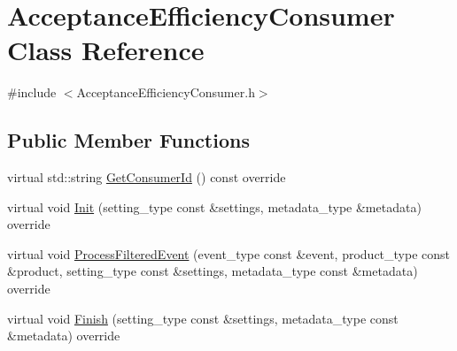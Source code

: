 \hypertarget{classAcceptanceEfficiencyConsumer}{
\section{AcceptanceEfficiencyConsumer Class Reference}
\label{classAcceptanceEfficiencyConsumer}
}


{\ttfamily \#include $<$AcceptanceEfficiencyConsumer.h$>$}\subsection*{Public Member Functions}
\begin{DoxyCompactItemize}
\item 
virtual std::string \hyperlink{classAcceptanceEfficiencyConsumer_a2e360a80f95608aa4ab46fb3bee7176b}{GetConsumerId} () const override
\item 
virtual void \hyperlink{classAcceptanceEfficiencyConsumer_a94a6e5885f6c469e5c639bd6af0f5183}{Init} (setting\_\-type const \&settings, metadata\_\-type \&metadata) override
\item 
virtual void \hyperlink{classAcceptanceEfficiencyConsumer_ad2a504069043f69a4d1f1eefc6146b70}{ProcessFilteredEvent} (event\_\-type const \&event, product\_\-type const \&product, setting\_\-type const \&settings, metadata\_\-type const \&metadata) override
\item 
virtual void \hyperlink{classAcceptanceEfficiencyConsumer_a56fd2273f9d0ac8ef5bf54f6ccc8f4da}{Finish} (setting\_\-type const \&settings, metadata\_\-type const \&metadata) override
\end{DoxyCompactItemize}


